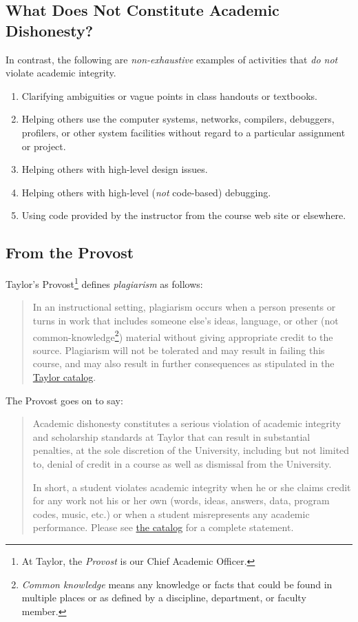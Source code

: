 \subsection{What Does Not Constitute Academic Dishonesty?}

In contrast, the following are \emph{non-exhaustive} examples of activities
that \emph{do not} violate academic integrity.

\begin{enumerate}
\item Clarifying ambiguities or vague points in class handouts or textbooks.
\item Helping others use the computer systems, networks, compilers, debuggers,
  profilers, or other system facilities without regard to a particular assignment or project.
\item Helping others with high-level design issues.
\item Helping others with high-level (\emph{not} code-based) debugging.
\item Using code provided by the instructor from the course web site or elsewhere.
\end{enumerate}

\subsection{From the Provost}

Taylor's Provost\footnote{At Taylor, the \emph{Provost} is our Chief Academic Officer.}
defines \emph{plagiarism} as follows:
\begin{quote}
  In an instructional setting,
  plagiarism occurs when a person presents or turns in work
  that includes someone else's ideas, language,
  or other (not common-knowledge\footnote{\emph{Common knowledge}
    means any knowledge or facts that could be found in multiple places
    or as defined by a discipline, department, or faculty member.}) material
  without giving appropriate credit to the source.
  Plagiarism will not be tolerated
  and may result in failing this course,
  and may also result in further consequences
  as stipulated in the
  \href{http://www.taylor.edu/academics/files/undergrad-catalog/current/catalog.pdf}{Taylor catalog}.
\end{quote}

The Provost goes on to say:
\begin{quote}
  Academic dishonesty constitutes a serious violation
  of academic integrity and scholarship standards at Taylor
  that can result in substantial penalties,
  at the sole discretion of the University,
  including but not limited to,
  denial of credit in a course as well as dismissal from the University.

  In short, a student violates academic integrity
  when he or she claims credit for any work not his or her own
  (words, ideas, answers, data, program codes, music, etc.)
  or when a student misrepresents any academic performance.
  Please see 
  \href{http://www.taylor.edu/academics/files/undergrad-catalog/current/catalog.pdf}%
  {the catalog} for a complete statement.
\end{quote}

